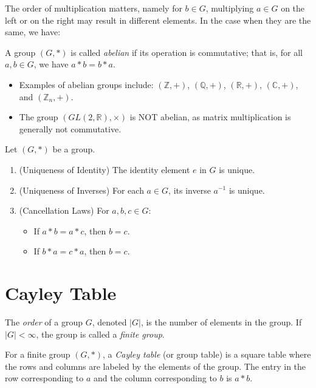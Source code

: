 The order of multiplication matters, namely for $b \in G$, multiplying $a \in G$ on the left or on the right may result in different elements. In the case when they are the same, we have:
\begin{definition}
A group $(G, \ast)$ is called \emph{abelian} if its operation is commutative; that is, for all $a, b \in G$, we have $a \ast b = b \ast a$.
\end{definition}

\begin{example}
\begin{itemize}
    \item Examples of abelian groups include: $(\mathbb{Z}, +)$, $(\mathbb{Q}, +)$, $(\mathbb{R}, +)$, $(\mathbb{C}, +)$, and $(\mathbb{Z}_n, +)$.
    \item The group $(GL(2, \mathbb{R}), \times)$ is NOT abelian, as matrix multiplication is generally not commutative.
\end{itemize}
\end{example}

\begin{proposition}
Let $(G, \ast)$ be a group.
\begin{enumerate}
    \item (Uniqueness of Identity) The identity element $e$ in $G$ is unique.
    \item (Uniqueness of Inverses) For each $a \in G$, its inverse $a^{-1}$ is unique.
    \item (Cancellation Laws) For $a, b, c \in G$:
    \begin{itemize}
        \item If $a \ast b = a \ast c$, then $b=c$.
        \item If $b \ast a = c \ast a$, then $b=c$.
    \end{itemize}
\end{enumerate}
\end{proposition}

\section{Cayley Table}

\begin{definition}
The \emph{order} of a group $G$, denoted $|G|$, is the number of elements in the group. If $|G| < \infty$, the group is called a \emph{finite group}.
\end{definition}

\begin{definition}
For a finite group $(G, \ast)$, a \emph{Cayley table} (or group table) is a square table where the rows and columns are labeled by the elements of the group. The entry in the row corresponding to $a$ and the column corresponding to $b$ is $a \ast b$.
\end{definition}

